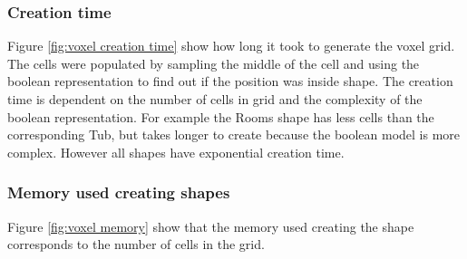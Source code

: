 \documentclass[11pt,twoside,a4paper]{report}
\begin{document}
\subsubsection{Creation time}
Figure \ref{fig:voxel creation time} show how long it took to generate the voxel grid. The cells were populated by sampling the middle of the cell and using the boolean representation to find out if the position was inside shape. The creation time is dependent on the number of cells in grid and the complexity of the boolean representation. For example the Rooms shape has less cells than the corresponding Tub, but takes longer to create because the boolean model is more complex. However all shapes have exponential creation time.

\subsubsection{Memory used creating shapes}
Figure \ref{fig:voxel memory} show that the memory used creating the shape corresponds to the number of cells in the grid.
\end{document}
